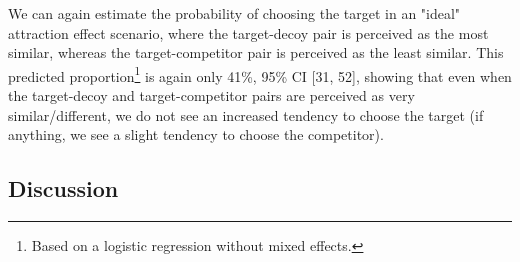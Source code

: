 \documentclass[11pt,a4paper]{article}
\begin{document}
\begin{table}[!htbp] \centering 
\captionsetup{justification=centering}
  \caption{Odds-ratios and 95\% CIs from a mixed-effects logistic model with subject-specific intercepts, Experiment 2. (T - Target, C - Competitor, D - Decoy)} 
  \label{latentattr_exp2reg} 
\end{table}


We can again estimate the probability of choosing the target in an "ideal" attraction effect scenario, where the target-decoy pair is perceived as the most similar, whereas the target-competitor pair is perceived as the least similar. This predicted proportion\footnote{Based on a logistic regression without mixed effects.} is again only 41\%, 95\% CI [31, 52], showing that even when the target-decoy and target-competitor pairs are perceived as very similar/different, we do not see an increased tendency to choose the target (if anything, we see a slight tendency to choose the competitor).

\subsection{Discussion}
\end{document}
